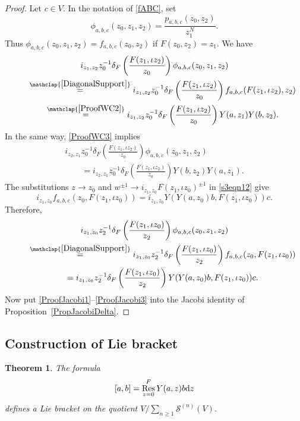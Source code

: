 \documentclass[pdftex]{sigma}
\numberwithin{equation}{section}
\newtheorem{Theorem}{Theorem}[section]
\theoremstyle{definition}
\DeclareMathOperator\Res{Res}
\begin{document}
\begin{proof}
Let $c\in V$. In the notation of \eqref{fABC}, set
\[
 \phi_{a,b,c}(z_0,z_1,z_2)=\frac{p_{a,b,c}(z_0,z_2)}{z_1^N}.
\]
Thus $\phi_{a,b,c}(z_0,z_1,z_2)=f_{a,b,c}(z_0,z_2)$ if $F(z_0,z_2)=z_1$. We have
\begin{gather}
i_{z_1,z_2}z_0^{-1}\delta_F\left(\frac{F(z_1,\iota z_2)}{z_0}\right)\phi_{a,b,c}(z_0,z_1,z_2)\nonumber\\
 \qquad\overset{\mathclap{\eqref{DiagonalSupport}}}{ = } i_{z_1,z_2}z_0^{-1}\delta_F\left(\frac{F(z_1,\iota z_2)}{z_0}\right) f_{a,b,c}(F(z_1,\iota z_2),z_2)\nonumber\\
\qquad \overset{\mathclap{\eqref{ProofWC2}}}{ = } i_{z_1,z_2}z_0^{-1}\delta_F\left(\frac{F(z_1,\iota z_2)}{z_0}\right)Y(a,z_1)Y(b,z_2).\label{ProofJacobi1}
\end{gather}
In the same way, \eqref{ProofWC3} implies
\begin{gather*}%
 i_{z_2,z_1}z_0^{-1}\delta_F\left(\frac{F(z_1,\iota z_2)}{z_0}\right)\phi_{a,b,c}(z_0,z_1,z_2)\\
\qquad =i_{z_2,z_1}z_0^{-1}\delta_F\left(\frac{F(z_1,\iota z_2)}{z_0}\right) Y(b,z_2)Y(a,z_1).
\end{gather*}
The substitutions $z\to z_0$ and $w^{\pm1}\to i_{z_1,z_0}F(z_1,\iota z_0)^{\pm1}$ in \eqref{s3eqn12} give
\[ %
 i_{z_1,z_0} f_{a,b,c}(z_0,F(z_1,\iota z_0))=i_{z_1,z_0}Y(Y(a,z_0)b,F(z_1,\iota z_0))c.
\]
Therefore,
\begin{gather}
 i_{z_1,z_0}z_2^{-1}\delta_F\left(\frac{F(z_1,\iota z_0)}{z_2}\right)\phi_{a,b,c}(z_0,z_1,z_2)\nonumber\\
\qquad \overset{\mathclap{\eqref{DiagonalSupport}}}{ = }i_{z_1,z_0}z_2^{-1}\delta_F\left(\frac{F(z_1,\iota z_0)}{z_2}\right)f_{a,b,c}(z_0,F(z_1,\iota z_0))\nonumber\\
 \qquad= i_{z_1,z_0}z_2^{-1}\delta_F\left(\frac{F(z_1,\iota z_0)}{z_2}\right)Y(Y(a,z_0)b,F(z_1,\iota z_0))c.\label{ProofJacobi3}
\end{gather}
Now put \eqref{ProofJacobi1}--\eqref{ProofJacobi3} into the Jacobi identity of Proposition~\ref{PropJacobiDelta}.
\end{proof}

\subsection{Construction of Lie bracket}
\label{s43}

\begin{Theorem}
The formula
\begin{equation}
\label{s4eqn1}
[a,b] = \Res_{z=0}^F Y(a,z)b {\rm d}z
\end{equation}
defines a Lie bracket on the quotient $V/\sum_{n\geqslant1}\mathcal{S}^{(n)}(V)$.
\end{Theorem}
\end{document}

